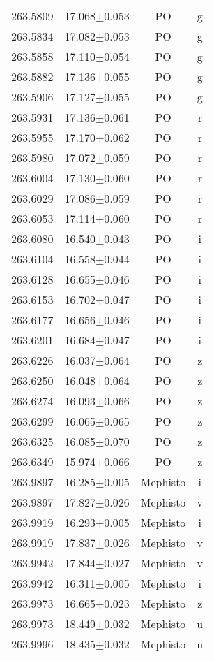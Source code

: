 \begin{table}
\begin{tabular}{cccc}
263.5809 & 17.068$\pm$0.053 & PO & g \\
263.5834 & 17.082$\pm$0.053 & PO & g \\
263.5858 & 17.110$\pm$0.054 & PO & g \\
263.5882 & 17.136$\pm$0.055 & PO & g \\
263.5906 & 17.127$\pm$0.055 & PO & g \\
263.5931 & 17.136$\pm$0.061 & PO & r \\
263.5955 & 17.170$\pm$0.062 & PO & r \\
263.5980 & 17.072$\pm$0.059 & PO & r \\
263.6004 & 17.130$\pm$0.060 & PO & r \\
263.6029 & 17.086$\pm$0.059 & PO & r \\
263.6053 & 17.114$\pm$0.060 & PO & r \\
263.6080 & 16.540$\pm$0.043 & PO & i \\
263.6104 & 16.558$\pm$0.044 & PO & i \\
263.6128 & 16.655$\pm$0.046 & PO & i \\
263.6153 & 16.702$\pm$0.047 & PO & i \\
263.6177 & 16.656$\pm$0.046 & PO & i \\
263.6201 & 16.684$\pm$0.047 & PO & i \\
263.6226 & 16.037$\pm$0.064 & PO & z \\
263.6250 & 16.048$\pm$0.064 & PO & z \\
263.6274 & 16.093$\pm$0.066 & PO & z \\
263.6299 & 16.065$\pm$0.065 & PO & z \\
263.6325 & 16.085$\pm$0.070 & PO & z \\
263.6349 & 15.974$\pm$0.066 & PO & z \\
263.9897 & 16.285$\pm$0.005 & Mephisto & i \\
263.9897 & 17.827$\pm$0.026 & Mephisto & v \\
263.9919 & 16.293$\pm$0.005 & Mephisto & i \\
263.9919 & 17.837$\pm$0.026 & Mephisto & v \\
263.9942 & 17.844$\pm$0.027 & Mephisto & v \\
263.9942 & 16.311$\pm$0.005 & Mephisto & i \\
263.9973 & 16.665$\pm$0.023 & Mephisto & z \\
263.9973 & 18.449$\pm$0.032 & Mephisto & u \\
263.9996 & 18.435$\pm$0.032 & Mephisto & u \\

\end{tabular}
\end{table}

